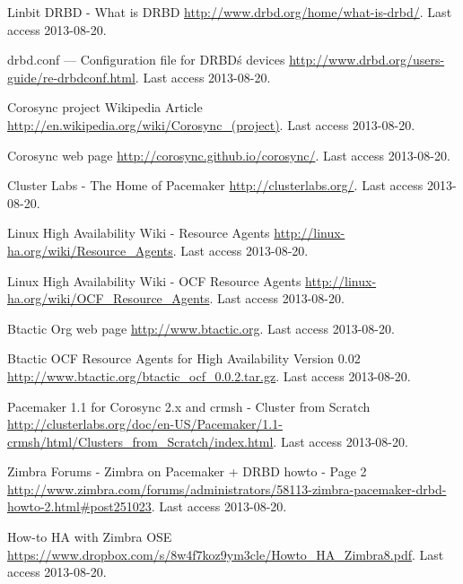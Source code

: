 \begin{thebibliography}{1}

 Linbit DRBD - What is DRBD
\url{http://www.drbd.org/home/what-is-drbd/}. Last access 2013-08-20.

 drbd.conf — Configuration file for DRBD\'s devices
\url{http://www.drbd.org/users-guide/re-drbdconf.html}. Last access 2013-08-20.


 Corosync project Wikipedia Article
\url{http://en.wikipedia.org/wiki/Corosync_(project)}. Last access 2013-08-20.

 Corosync web page
\url{http://corosync.github.io/corosync/}. Last access 2013-08-20.

 Cluster Labs - The Home of Pacemaker
\url{http://clusterlabs.org/}. Last access 2013-08-20.


 Linux High Availability Wiki - Resource Agents
\url{http://linux-ha.org/wiki/Resource_Agents}. Last access 2013-08-20.

 Linux High Availability Wiki - OCF Resource Agents
\url{http://linux-ha.org/wiki/OCF_Resource_Agents}. Last access 2013-08-20.

 Btactic Org web page
\url{http://www.btactic.org}. Last access 2013-08-20.

 Btactic OCF Resource Agents for High Availability Version 0.02
\url{http://www.btactic.org/btactic_ocf_0.0.2.tar.gz}. Last access 2013-08-20.


 Pacemaker 1.1 for Corosync 2.x and crmsh - Cluster from Scratch
\url{http://clusterlabs.org/doc/en-US/Pacemaker/1.1-crmsh/html/Clusters_from_Scratch/index.html}. Last access 2013-08-20.


 Zimbra Forums - Zimbra on Pacemaker + DRBD howto - Page 2
\url{http://www.zimbra.com/forums/administrators/58113-zimbra-pacemaker-drbd-howto-2.html#post251023}. Last access 2013-08-20.

 How-to HA with Zimbra OSE
\url{https://www.dropbox.com/s/8w4f7koz9ym3cle/Howto_HA_Zimbra8.pdf}. Last access 2013-08-20.


\end{thebibliography}

